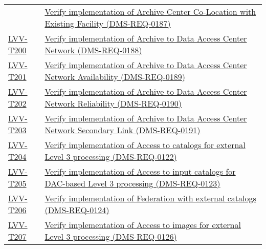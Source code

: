 \begin{longtable}[]{p{3cm}p{13cm}}
&
\href{https://jira.lsstcorp.org/secure/Tests.jspa\#/testCase/LVV-T199}{Verify
implementation of Archive Center Co-Location with Existing Facility
(DMS-REQ-0187)}\tabularnewline
\protect\hyperlink{lvv-t200---verify-implementation-of-archive-to-data-access-center-network-dms-req-0188}{LVV-T200}
&
\href{https://jira.lsstcorp.org/secure/Tests.jspa\#/testCase/LVV-T200}{Verify
implementation of Archive to Data Access Center Network
(DMS-REQ-0188)}\tabularnewline
\protect\hyperlink{lvv-t201---verify-implementation-of-archive-to-data-access-center-network-availability-dms-req-0189}{LVV-T201}
&
\href{https://jira.lsstcorp.org/secure/Tests.jspa\#/testCase/LVV-T201}{Verify
implementation of Archive to Data Access Center Network Availability
(DMS-REQ-0189)}\tabularnewline
\protect\hyperlink{lvv-t202---verify-implementation-of-archive-to-data-access-center-network-reliability-dms-req-0190}{LVV-T202}
&
\href{https://jira.lsstcorp.org/secure/Tests.jspa\#/testCase/LVV-T202}{Verify
implementation of Archive to Data Access Center Network Reliability
(DMS-REQ-0190)}\tabularnewline
\protect\hyperlink{lvv-t203---verify-implementation-of-archive-to-data-access-center-network-secondary-link-dms-req-0191}{LVV-T203}
&
\href{https://jira.lsstcorp.org/secure/Tests.jspa\#/testCase/LVV-T203}{Verify
implementation of Archive to Data Access Center Network Secondary Link
(DMS-REQ-0191)}\tabularnewline
\protect\hyperlink{lvv-t204---verify-implementation-of-access-to-catalogs-for-external-level-3-processing-dms-req-0122}{LVV-T204}
&
\href{https://jira.lsstcorp.org/secure/Tests.jspa\#/testCase/LVV-T204}{Verify
implementation of Access to catalogs for external Level 3 processing
(DMS-REQ-0122)}\tabularnewline
\protect\hyperlink{lvv-t205---verify-implementation-of-access-to-input-catalogs-for-dac-based-level-3-processing-dms-req-0123}{LVV-T205}
&
\href{https://jira.lsstcorp.org/secure/Tests.jspa\#/testCase/LVV-T205}{Verify
implementation of Access to input catalogs for DAC-based Level 3
processing (DMS-REQ-0123)}\tabularnewline
\protect\hyperlink{lvv-t206---verify-implementation-of-federation-with-external-catalogs-dms-req-0124}{LVV-T206}
&
\href{https://jira.lsstcorp.org/secure/Tests.jspa\#/testCase/LVV-T206}{Verify
implementation of Federation with external catalogs
(DMS-REQ-0124)}\tabularnewline
\protect\hyperlink{lvv-t207---verify-implementation-of-access-to-images-for-external-level-3-processing-dms-req-0126}{LVV-T207}
&
\href{https://jira.lsstcorp.org/secure/Tests.jspa\#/testCase/LVV-T207}{Verify
implementation of Access to images for external Level 3 processing
(DMS-REQ-0126)}\tabularnewline

\end{longtable}
